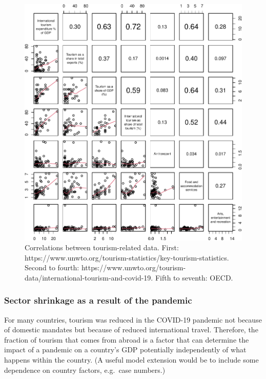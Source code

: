 \documentclass[
]{article}
\begin{document}
\begin{figure}

{\centering \includegraphics{README_files/figure-latex/pairs-1} 

}

\caption{Correlations between tourism-related data. First: https://www.unwto.org/tourism-statistics/key-tourism-statistics. Second to fourth: https://www.unwto.org/tourism-data/international-tourism-and-covid-19. Fifth to seventh: OECD.}\label{fig:pairs}
\end{figure}

\newpage

\hypertarget{sector-shrinkage-as-a-result-of-the-pandemic}{%
\subsubsection{Sector shrinkage as a result of the pandemic}\label{sector-shrinkage-as-a-result-of-the-pandemic}}

For many countries, tourism was reduced in the COVID-19 pandemic not because of domestic mandates but because of reduced international travel. Therefore, the fraction of tourism that comes from abroad is a factor that can determine the impact of a pandemic on a country's GDP potentially independently of what happens within the country. (A useful model extension would be to include some dependence on country factors, e.g.~case numbers.)
\end{document}

